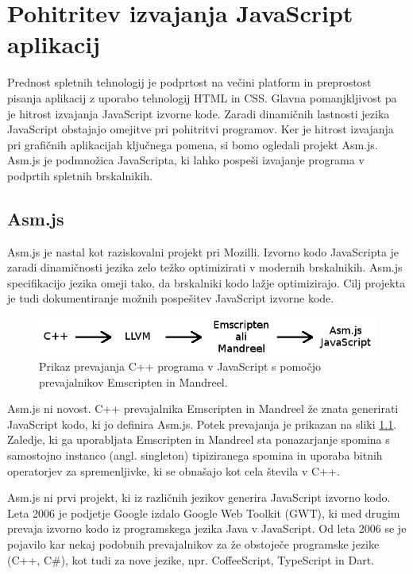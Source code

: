 \chapter{Pohitritev izvajanja JavaScript\\ aplikacij}
\label{sec:asm}
Prednost spletnih tehnologij je podprtost na večini platform in preprostost pisanja aplikacij z uporabo tehnologij HTML in CSS. Glavna pomanjkljivost pa je hitrost izvajanja JavaScript izvorne kode. Zaradi dinamičnih lastnosti jezika JavaScript obstajajo omejitve pri pohitritvi programov. Ker je hitrost izvajanja pri grafičnih aplikacijah ključnega pomena, si bomo ogledali projekt Asm.js. Asm.js je podmnožica JavaScripta, ki lahko pospeši izvajanje programa v podprtih spletnih brskalnikih.

\section{Asm.js}

Asm.js \cite{asm} je nastal kot raziskovalni projekt pri Mozilli. Izvorno kodo JavaScripta je zaradi dinamičnosti jezika zelo težko optimizirati v modernih brskalnikih. Asm.js specifikacijo jezika omeji tako, da brskalniki kodo lažje optimizirajo. Cilj projekta je tudi dokumentiranje možnih pospešitev JavaScript izvorne kode.

\begin{figure}
\begin{center}
\includegraphics[width=12.5cm]{pic/emscr.png}
\end{center}
\caption{Prikaz prevajanja C++ programa v JavaScript s pomočjo prevajalnikov Emscripten in Mandreel.}
\label{emscr}
\end{figure} 

Asm.js ni novost. C++ prevajalnika Emscripten in Mandreel že znata generirati JavaScript kodo, ki jo definira Asm.js. Potek prevajanja je prikazan na sliki \ref{emscr}. Zaledje, ki ga uporabljata Emscripten in Mandreel sta ponazarjanje spomina s samostojno instanco (angl. singleton) tipiziranega spomina in uporaba bitnih operatorjev za spremenljivke, ki se obnašajo kot cela števila v C++.

Asm.js ni prvi projekt, ki iz različnih jezikov generira JavaScript izvorno kodo. Leta 2006 je podjetje Google izdalo Google Web Toolkit (GWT), ki med drugim prevaja izvorno kodo iz programskega jezika Java v JavaScript. Od leta 2006 se je pojavilo kar nekaj podobnih prevajalnikov za že obstoječe programske jezike (C++, C\#), kot tudi za nove jezike, npr. CoffeeScript, TypeScript in Dart.

